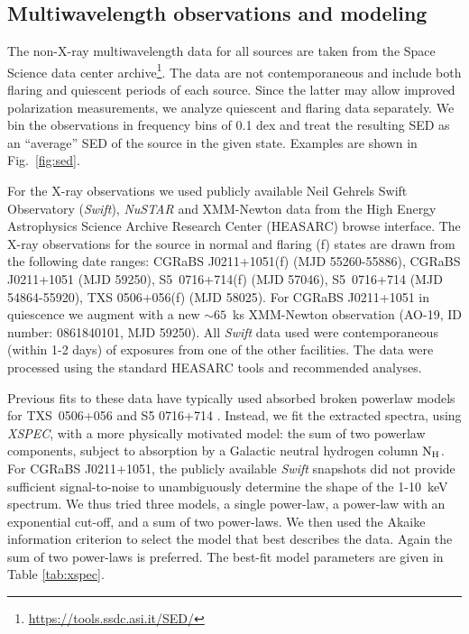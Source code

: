 \subsection{Multiwavelength observations and modeling} 
\label{sec:dm}

The non-X-ray multiwavelength data for all sources are taken from the Space Science data center archive\footnote{\url{https://tools.ssdc.asi.it/SED/}}. The data are not contemporaneous and include both flaring and quiescent periods of each source. Since the latter may allow improved polarization measurements, we analyze quiescent and flaring data separately. We bin the observations in frequency bins of 0.1 dex and treat the resulting SED as an ``average'' SED of the source in the given state. Examples are shown in Fig.~\ref{fig:sed}.

For the X-ray observations we used publicly available Neil Gehrels Swift Observatory ({\it Swift}), {\it NuSTAR} and XMM-Newton data from the High Energy Astrophysics Science Archive Research Center (HEASARC) browse interface. The X-ray observations for the source in normal and flaring (f) states are drawn from the following date ranges: 
CGRaBS J0211+1051(f) (MJD 55260-55886),
CGRaBS J0211+1051 (MJD 59250),
S5~0716+714(f) (MJD 57046),
S5~0716+714 (MJD 54864-55920),
TXS 0506+056(f) (MJD 58025).
For CGRaBS J0211+1051 in quiescence we augment with a new $\sim65$~ks XMM-Newton observation (AO-19, ID number: 0861840101, MJD 59250). All {\it Swift} data used were contemporaneous (within 1-2 days) of exposures from one of the other facilities.  The data were processed using the standard HEASARC tools and recommended analyses.

Previous fits to these data have typically used absorbed broken powerlaw models for TXS~0506+056 \citep{icecube_multi-messenger_2018} and S5 0716+714 \citep{wierzcholska_first_2016}. Instead, we fit the extracted spectra, using {\it XSPEC}, with a more physically motivated model: the sum of two powerlaw components, subject to absorption by a Galactic neutral hydrogen column $\rm N_H$. For CGRaBS J0211+1051, the publicly available {\it Swift} snapshots did not provide sufficient signal-to-noise to unambiguously determine the shape of the 1-10~keV spectrum. We thus tried three models, a single power-law, a power-law with an exponential cut-off, and a sum of two power-laws. We then used the Akaike information criterion to select the model that best describes the data. Again the sum of two power-laws is preferred. The best-fit model parameters are given in Table \ref{tab:xspec}. 

